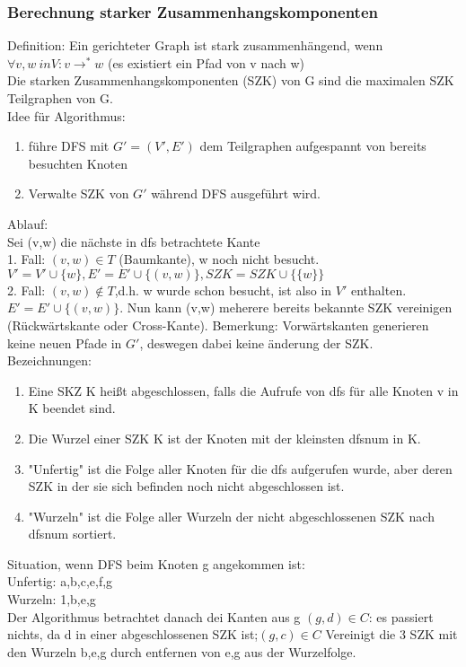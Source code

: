 \documentclass[a4paper]{article}
\begin{document}
\subsubsection*{Berechnung starker Zusammenhangskomponenten}
Definition: Ein gerichteter Graph ist stark zusammenhängend, wenn $\forall v,w \ in V: v\rightarrow^* w$ (es existiert ein Pfad von v nach w)\\
Die starken Zusammenhangskomponenten (SZK) von G sind die maximalen SZK Teilgraphen von G.\\
Idee für Algorithmus:\\
\begin{enumerate}
\item führe DFS mit $G'=(V',E')$ dem Teilgraphen aufgespannt von bereits besuchten Knoten
\item Verwalte SZK von $G'$ während DFS ausgeführt wird.
\end{enumerate}
Ablauf:\\
Sei (v,w) die nächste in dfs betrachtete Kante\\
1. Fall: $(v,w)\in T$ (Baumkante), w noch nicht besucht.  $V' = V'\cup \{w\}, E' = E'\cup \{(v,w)\},SZK=SZK\cup \{\{w\}\}$\\
2. Fall: $(v,w)\not\in T$,d.h. w wurde schon besucht, ist also in $V'$ enthalten.$E'=E'\cup\{(v,w)\}$. Nun kann (v,w) meherere bereits bekannte SZK vereinigen (Rückwärtskante oder Cross-Kante). Bemerkung: Vorwärtskanten generieren keine neuen Pfade in $G'$, deswegen dabei keine änderung der SZK.\\
Bezeichnungen:\\
\begin{enumerate}
\item Eine SKZ K heißt abgeschlossen, falls die Aufrufe von dfs für alle Knoten v in K beendet sind.
\item Die Wurzel einer SZK K ist der Knoten mit der kleinsten dfsnum in K.
\item "Unfertig" ist die Folge aller Knoten für die dfs aufgerufen wurde, aber deren SZK in der sie sich befinden noch nicht abgeschlossen ist.
\item "Wurzeln" ist die Folge aller Wurzeln der nicht abgeschlossenen SZK nach dfsnum sortiert.
\end{enumerate}
Situation, wenn DFS beim Knoten g angekommen ist:\\
Unfertig: a,b,c,e,f,g\\
Wurzeln: 1,b,e,g\\
Der Algorithmus betrachtet danach dei Kanten aus g $(g,d)\in C$: es passiert nichts, da d in einer abgeschlossenen SZK ist;$(g,c)\in C$ Vereinigt die 3 SZK mit den Wurzeln b,e,g durch entfernen von e,g aus der Wurzelfolge.\\
\end{document}
